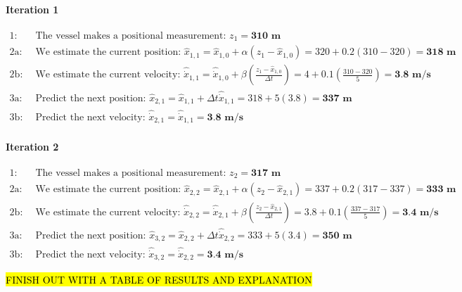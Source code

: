 \begin{example}
        \paragraph{Iteration 1}
        \begin{equation*}
            \begin{aligned} 
                1:& \text{ The vessel makes a positional measurement: } z_1 = \textbf{310 m} \\
                2\text{a}:& \text{ We estimate the current position: } \hat{x}_{1,1} = \hat{x}_{1,0} + \alpha(z_1 - \hat{x}_{1,0}) = 320 + 0.2(310 - 320) = \textbf{318 m} \\
                2\text{b}:& \text{ We estimate the current velocity: } \hat{\dot{x}}_{1,1} = \hat{\dot{x}}_{1,0} + \beta(\frac{z_1 - \hat{x}_{1,0}}{\Delta t}) = 4 + 0.1(\frac{310 - 320}{5}) = \textbf{3.8 m/s} \\
                3\text{a}:& \text{ Predict the next position: } \hat{x}_{2,1} = \hat{x}_{1,1} + \Delta t \hat{\dot{x}}_{1,1} = 318 + 5(3.8) = \textbf{337 m} \\
                3\text{b}:& \text{ Predict the next velocity: } \hat{\dot{x}}_{2,1} = \hat{\dot{x}}_{1,1} = \textbf{3.8 m/s}
            \end{aligned}
        \end{equation*}

        \paragraph{Iteration 2}
        \begin{equation*}
            \begin{aligned} 
                1:& \text{ The vessel makes a positional measurement: } z_2 = \textbf{317 m} \\
                2\text{a}:& \text{ We estimate the current position: } \hat{x}_{2,2} = \hat{x}_{2,1} + \alpha(z_2 - \hat{x}_{2,1}) = 337 + 0.2(317 - 337) = \textbf{333 m} \\
                2\text{b}:& \text{ We estimate the current velocity: } \hat{\dot{x}}_{2,2} = \hat{\dot{x}}_{2,1} + \beta(\frac{z_2 - \hat{x}_{2,1}}{\Delta t}) = 3.8 + 0.1(\frac{337 - 317}{5}) = \textbf{3.4 m/s} \\
                3\text{a}:& \text{ Predict the next position: } \hat{x}_{3,2} = \hat{x}_{2,2} + \Delta t \hat{\dot{x}}_{2,2} = 333 + 5(3.4) = \textbf{350 m} \\
                3\text{b}:& \text{ Predict the next velocity: } \hat{\dot{x}}_{3,2} = \hat{\dot{x}}_{2,2} = \textbf{3.4 m/s}
            \end{aligned}
        \end{equation*}

        \hl{FINISH OUT WITH A TABLE OF RESULTS AND EXPLANATION}

        \end{example}

